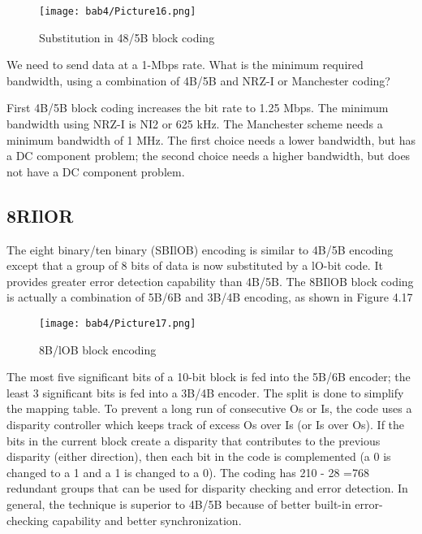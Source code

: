 \begin{figure}[htbp]
  \centering
  \texttt{[image: bab4/Picture16.png]}
  \caption{Substitution in 48/5B block coding}
  \label{fig4:16}
\end{figure}

\vspace{12pt}

\begin{example}
  We need to send data at a 1-Mbps rate. What is the minimum required bandwidth, using a combination of 4B/5B and NRZ-I or Manchester coding?
\end{example}

\begin{solution}
  First 4B/5B block coding increases the bit rate to 1.25 Mbps. The minimum bandwidth using NRZ-I is NI2 or 625 kHz. The Manchester scheme needs a minimum bandwidth of 1 MHz. The first choice needs a lower bandwidth, but has a DC component problem; the second choice needs a higher bandwidth, but does not have a DC component problem.
\end{solution}

\subsection*{8RIlOR}
The eight binary/ten binary (SBIlOB) encoding is similar to 4B/5B encoding except that a group of 8 bits of data is now substituted by a lO-bit code. It provides greater error detection capability than 4B/5B. The 8BIlOB block coding is actually a combination of 5B/6B and 3B/4B encoding, as shown in Figure 4.17

\begin{figure}
  \centering
  \texttt{[image: bab4/Picture17.png]}
  \caption{8B/lOB block encoding}
  \label{fig4:17}
\end{figure}

The most five significant bits of a 10-bit block is fed into the 5B/6B encoder; the least 3 significant bits is fed into a 3B/4B encoder. The split is done to simplify the mapping table. To prevent a long run of consecutive Os or Is, the code uses a disparity controller which keeps track of excess Os over Is (or Is over Os). If the bits in the current block create a disparity that contributes to the previous disparity (either direction), then each bit in the code is complemented (a 0 is changed to a 1 and a 1 is changed to a 0). The coding has 210 - 28 =768 redundant groups that can be used for disparity checking and error detection. In general, the technique is superior to 4B/5B because of better built-in error-checking capability and better synchronization.

